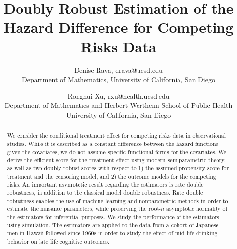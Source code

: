 \documentclass[11pt]{article}
\title{Doubly Robust Estimation of the Hazard Difference for Competing Risks Data}{}
\author
{
Denise Rava, drava@ucsd.edu \\
Department of Mathematics, University of California, San Diego
\and
Ronghui Xu, rxu@health.ucsd.edu \\
Department of Mathematics and Herbert Wertheim School of Public Health\\
 University of California, San Diego
}
\date{}
\begin{document}
\maketitle



\begin{abstract}
We consider the conditional treatment effect for competing risks data in observational studies. While it is described as a constant difference between the hazard functions given the covariates, we do not assume specific functional forms  for the covariates. We derive the efficient score for the treatment effect using modern semiparametric theory, as well as two doubly robust scores with respect to 1) the assumed propensity score for treatment and the censoring model, and 2) the outcome models for the competing risks. An important asymptotic result regarding  the estimators is rate double robustness, in addition to the classical model double robustness. 
Rate double robustness enables the use of machine learning and nonparametric methods in order to estimate the nuisance parameters, while preserving the root-$n$ asymptotic normality of the estimators for inferential purposes. We study the performance of the estimators using simulation. The estimators are applied to the data from a cohort of Japanese men in Hawaii followed since 1960s in order to study the effect of mid-life drinking behavior on late life cognitive outcomes. 

\end{abstract}

%





\end{document}
